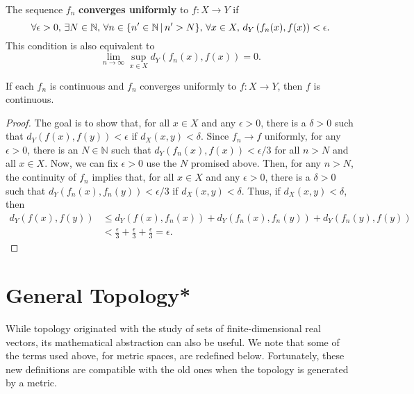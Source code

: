 \begin{definition}
The sequence $f_n$ \textbf{converges uniformly} to $f \colon X \to Y$ if \vspace{-1mm}
\[ \forall \epsilon > 0, \, \exists N\in \mathbb{N}, \, \forall n \in \{ n' \in \mathbb{N}\,|\, n'>N \}, \, \forall x\in X, \, d_Y \left( f_n(x),f(x) \right) < \epsilon. \vspace*{-1mm} \]
This condition is also equivalent to \vspace{-1mm}
\[ \lim_{n\to \infty} \sup_{x\in X} d_Y \left( f_n (x) , f(x) \right) = 0. \]
 \end{definition}

\begin{theorem}
If each $f_n$ is continuous and $f_n$ converges uniformly to $f \colon X \to Y$, then $f$ is continuous.
\end{theorem}
\begin{proof}
The goal is to show that, for all $x\in X$ and any $\epsilon > 0$, there is a $\delta>0$ such that $d_Y (f (x),f (y)) < \epsilon$ if $d_X (x,y) < \delta$.
Since $f_n \to f$ uniformly, for any $\epsilon >0$, there is an $N\in \mathbb{N}$ such that $d_Y (f_n (x), f(x) ) < \epsilon / 3$ for all $n > N$ and all $x\in X$.
Now, we can fix $\epsilon > 0$ use the $N$ promised above.
Then, for any $n>N$, the continuity of $f_n$ implies that, for all $x\in X$ and any $\epsilon >0$, there is a $\delta>0$ such that $d_Y (f_n (x),f_n(y)) < \epsilon/3$ if $d_X (x,y) < \delta$.
Thus, if $d_X (x,y) < \delta$, then
\begin{align*}
d_Y (f(x),f(y))
&\leq d_Y (f(x),f_n (x)) + d_Y (f_n (x) ,f_n (y) ) + d_Y (f_n (y), f(y) ) \\
& < \frac{\epsilon}{3} + \frac{\epsilon}{3} + \frac{\epsilon}{3} = \epsilon.
\end{align*}
\end{proof}

\section{General Topology*}

While topology originated with the study of sets of finite-dimensional real vectors, its mathematical abstraction can also be useful.
We note that some of the terms used above, for metric spaces, are redefined below.
Fortunately, these new definitions are compatible with the old ones when the topology is generated by a metric.

